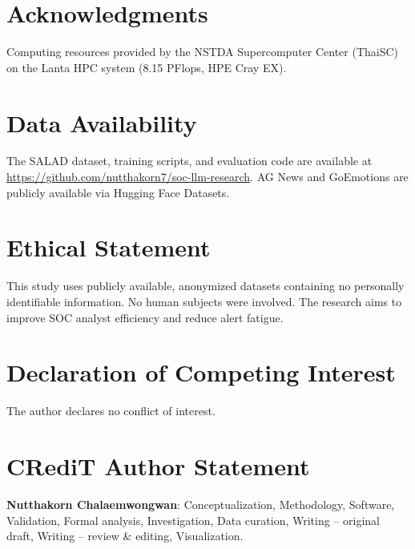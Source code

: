 \documentclass[review,3p]{elsarticle}
\begin{document}
\section*{Acknowledgments}
Computing resources provided by the NSTDA Supercomputer Center (ThaiSC) on the Lanta HPC system (8.15 PFlops, HPE Cray EX).


\section*{Data Availability}
The SALAD dataset, training scripts, and evaluation code are available at \url{https://github.com/nutthakorn7/soc-llm-research}. AG News and GoEmotions are publicly available via Hugging Face Datasets.

\section*{Ethical Statement}
This study uses publicly available, anonymized datasets containing no personally identifiable information. No human subjects were involved. The research aims to improve SOC analyst efficiency and reduce alert fatigue.

\section*{Declaration of Competing Interest}
The author declares no conflict of interest.

\section*{CRediT Author Statement}
\textbf{Nutthakorn Chalaemwongwan}: Conceptualization, Methodology, Software, Validation, Formal analysis, Investigation, Data curation, Writing -- original draft, Writing -- review \& editing, Visualization.
\end{document}
